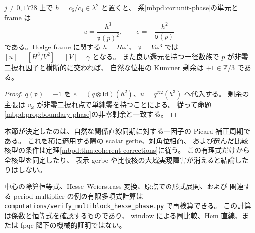 \begin{corollary}[既存の単元表示と境界剰余]
\label{mbhp:cor:unit-and-residue}
$j\ne0,1728$ 上で $h=c_6/c_4\in\lambda^2$ と置くと、
系\ref{mbpd:cor:unit-phase}の単元と frame は
\[
 u=\frac{h^3}{\mathfrak v(p)^2},\qquad
 e=-\frac{h^2}{\mathfrak v(p)}
\]
である。Hodge frame に関する $h=H\omega^2$、
$\mathfrak v=V\omega^3$ では
$[u]=[H^3/V^2]=[V]=\gamma$ となる。
また良い還元を持つ一径数族で $p$ が非零二捩れ因子と横断的に交われば、
自然な位相の Kummer 剰余は $+1\in\mathbb Z/3$ である。
\end{corollary}
\begin{proof}
$q(\mathfrak v)=-1$ を
$e=(q\otimes\mathrm{id})(h^2)$、$u=q^{\otimes2}(h^3)$ へ代入する。
剰余の主張は $v_\omega$ が非零二捩れ点で単純零を持つことによる。
従って命題\ref{mbpd:prop:boundary-phase}の非零剰余と一致する。
\end{proof}

本節が決定したのは、自然な関係直線同期に対する一因子の
Picard 補正周期である。
これを積に適用する際の scalar gerbe、対角位相商、
および選んだ比較核型の条件は定理\ref{mbpd:thm:coherent-corrections}に従う。
この有理式だけから全核型を同定したり、
表示 gerbe や比較核の大域実現障害が消えると結論したりはしない。

中心の除算恒等式、Hesse--Weierstrass 変換、原点での形式展開、および
関連する period multiplier の例の有限多項式計算は
\texttt{computations/verify\_multiblock\_hesse\_phase.py} で再検算できる。
この計算は係数と恒等式を確認するものであり、
window による圏比較、Hom 直線、または fpqc 降下の機械的証明ではない。
